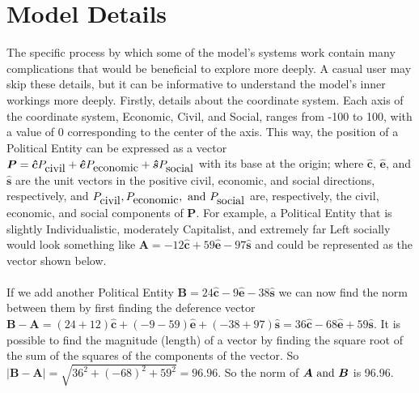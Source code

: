 \documentclass[12pt]{article}
\newcommand{\civ}{\bm{\hat{c}}}
\newcommand{\econ}{\bm{\hat{e}}}
\newcommand{\soc}{\bm{\hat{s}}}
\begin{document}
\section{Model Details}

\qquad The specific process by which some of the model's systems work contain many complications that would be beneficial to explore more deeply. A casual user may skip these details, but it can be informative to understand the model's inner workings more deeply. Firstly, details about the coordinate system. Each axis of the coordinate system, Economic, Civil, and Social, ranges from -100 to 100, with a value of 0 corresponding to the center of the axis. This way, the position of a Political Entity can be expressed as a vector $\bm{P} = \civ P_{\hbox{civil}} + \econ P_{\hbox{economic}} + \soc P_{\hbox{social}}$ with its base at the origin; where $\civ$, $\econ$, and $\soc$ are the unit vectors in the positive civil, economic, and social directions, respectively, and $P_{\hbox{civil}}, P_{\hbox{economic}}, \hbox{ and } P_{\hbox{social}}$ are, respectively, the civil, economic, and social components of $\bm{P}$. For example, a Political Entity that is slightly Individualistic, moderately Capitalist, and extremely far Left socially would look something like $\bm{A} = -12\civ + 59\econ - 97\soc$ and could be represented as the vector shown below. \\

\\

If we add another Political Entity $\bm{B} = 24\civ - 9\econ - 38\soc$ we can now find the norm between them by first finding the deference vector $\bm{B} - \bm{A} = (24 + 12)\civ + (-9 - 59)\econ + (-38 + 97)\soc = 36\civ - 68\econ + 59\soc$. It is possible to find the magnitude (length) of a vector by finding the square root of the sum of the squares of the components of the vector. So $|\bm{B} - \bm{A}| = \sqrt{36^2 + (-68)^2 + 59^2} = 96.96$. So the norm of $\bm{A} \hbox{ and } \bm{B}$ is 96.96.\\
\end{document}
